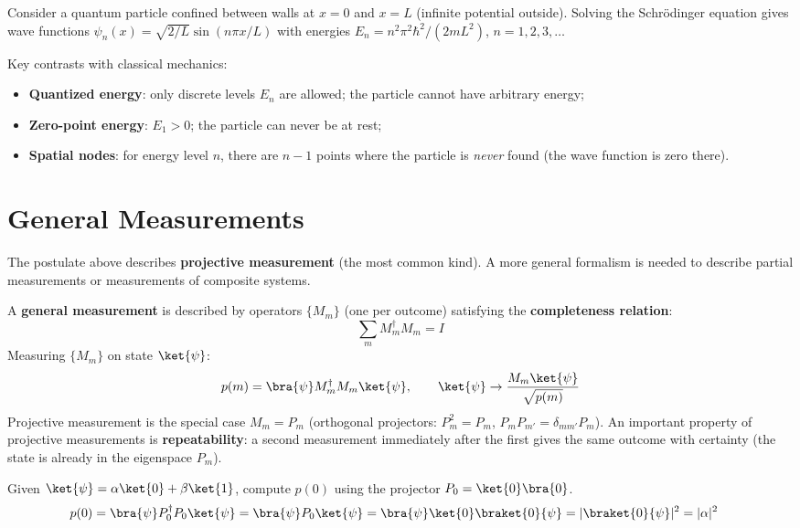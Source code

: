 \documentclass[oneside]{academica}
\begin{document}
\begin{example*}
  Consider a quantum particle confined between walls at $x=0$ and $x=L$ (infinite potential outside).
  Solving the Schr\"{o}dinger equation gives wave functions $\psi_n(x)=\sqrt{2/L}\sin(n\pi x/L)$ with energies $E_n=n^2\pi^2\hbar^2/(2mL^2)$, $n=1,2,3,\ldots$
  
  Key contrasts with classical mechanics:
  \begin{itemize}
    \item \textbf{Quantized energy}: only discrete levels $E_n$ are allowed; the particle cannot have arbitrary energy;
    \item \textbf{Zero-point energy}: $E_1>0$; the particle can never be at rest;
    \item \textbf{Spatial nodes}: for energy level $n$, there are $n-1$ points where the particle is \emph{never} found (the wave function is zero there).
  \end{itemize}
\end{example*}

\section{General Measurements}

The postulate above describes \textbf{projective measurement} (the most common kind).
A more general formalism is needed to describe partial measurements or measurements of composite systems.

A \textbf{general measurement} is described by operators $\{M_m\}$ (one per outcome) satisfying the \textbf{completeness relation}:
\begin{equation*}
  \sum_m M_m^\dagger M_m = I
\end{equation*}
Measuring $\{M_m\}$ on state $\ket{\psi}$:
\begin{equation*}
  p(m)=\bra{\psi}M_m^\dagger M_m\ket{\psi},\qquad \ket{\psi}\to\frac{M_m\ket{\psi}}{\sqrt{p(m)}}
\end{equation*}
Projective measurement is the special case $M_m=P_m$ (orthogonal projectors: $P_m^2=P_m$, $P_mP_{m'}=\delta_{mm'}P_m$).
An important property of projective measurements is \textbf{repeatability}: a second measurement immediately after the first gives the same outcome with certainty (the state is already in the eigenspace $P_m$).

\begin{exercise*}
  Given $\ket{\psi}=\alpha\ket{0}+\beta\ket{1}$, compute $p(0)$ using the projector $P_0=\ket{0}\bra{0}$.
  \begin{align*}
    p(0)&=\bra{\psi}P_0^\dagger P_0\ket{\psi}=\bra{\psi}P_0\ket{\psi}
        =\bra{\psi}\ket{0}\braket{0}{\psi}=|\braket{0}{\psi}|^2=|\alpha|^2
  \end{align*}
\end{exercise*}
\end{document}
